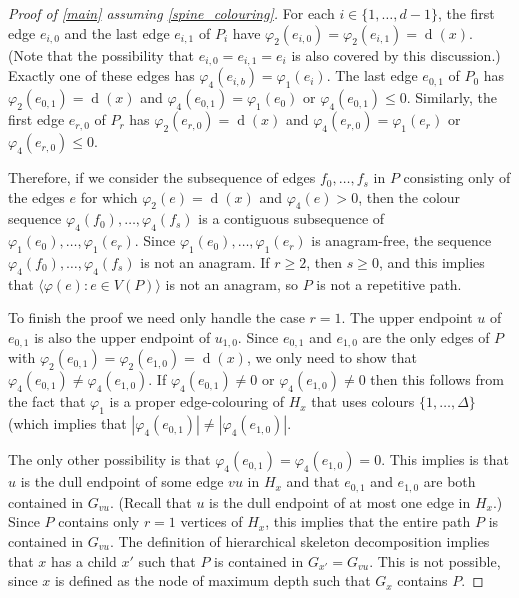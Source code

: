 \documentclass[kpfonts]{patmorin}
\DeclareMathOperator{\depth}{d}
\begin{document}
\begin{proof}[Proof of \cref{main} assuming \cref{spine_colouring}]
    For each $i\in\{1,\ldots,d-1\}$, the first edge $e_{i,0}$ and the last edge $e_{i,1}$ of $P_i$ have $\varphi_2(e_{i,0})=\varphi_2(e_{i,1})=\depth(x)$. (Note that the possibility that $e_{i,0}=e_{i,1}=e_i$ is also covered by this discussion.) Exactly one of these edges has $\varphi_4(e_{i,b})=\varphi_1(e_i)$.  The last edge $e_{0,1}$ of $P_{0}$ has $\varphi_2(e_{0,1})=\depth(x)$ and $\varphi_4(e_{0,1})=\varphi_1(e_0)$ or $\varphi_4(e_{0,1})\le 0$.  Similarly, the first edge $e_{r,0}$ of $P_r$ has $\varphi_2(e_{r,0})=\depth(x)$ and $\varphi_4(e_{r,0})=\varphi_1(e_r)$ or $\varphi_4(e_{r,0})\le 0$.

    Therefore, if we consider the subsequence of edges $f_0,\ldots,f_s$ in $P$ consisting only of the edges $e$ for which $\varphi_2(e)=\depth(x)$ and $\varphi_4(e)>0$, then the colour sequence $\varphi_4(f_0),\ldots,\varphi_4(f_s)$ is a contiguous subsequence of $\varphi_1(e_0),\ldots,\varphi_1(e_r)$.  Since $\varphi_1(e_0),\ldots,\varphi_1(e_r)$ is anagram-free, the sequence $\varphi_4(f_0),\ldots,\varphi_4(f_s)$ is not an anagram.  If $r\ge 2$, then $s\ge 0$, and this implies that $\langle \varphi(e):e\in V(P)\rangle$ is not an anagram, so $P$ is not a repetitive path.

    To finish the proof we need only handle the case $r=1$.  The upper endpoint $u$ of $e_{0,1}$ is also the upper endpoint of $u_{1,0}$.  Since $e_{0,1}$ and $e_{1,0}$ are the only edges of $P$ with $\varphi_2(e_{0,1})=\varphi_2(e_{1,0})=\depth(x)$, we only need to show that $\varphi_4(e_{0,1})\neq\varphi_4(e_{1,0})$.  If $\varphi_4(e_{0,1})\neq 0$ or $\varphi_4(e_{1,0})\neq 0$ then this follows from the fact that $\varphi_1$ is a proper edge-colouring of $H_x$ that uses colours $\{1,\ldots,\Delta\}$ (which implies that $|\varphi_4(e_{0,1})|\neq|\varphi_4(e_{1,0})|$.


    The only other possibility is that $\varphi_4(e_{0,1})=\varphi_4(e_{1,0})=0$.  This implies is that $u$ is the dull endpoint of some edge $vu$ in $H_x$ and that $e_{0,1}$ and $e_{1,0}$ are both contained in $G_{vu}$. (Recall that $u$ is the dull endpoint of at most one edge in $H_x$.)  Since $P$ contains only $r=1$ vertices of $H_x$, this implies that the entire path $P$ is contained in $G_{vu}$.  The definition of hierarchical skeleton decomposition implies that $x$ has a child $x'$ such that $P$ is contained in $G_{x'}=G_{vu}$.  This is not possible, since $x$ is defined as the node of maximum depth such that $G_x$ contains $P$.
\end{proof}
\end{document}
